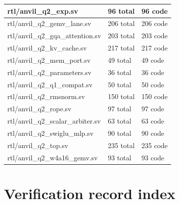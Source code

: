 \documentclass[11pt,a4paper]{article}
\begin{document}
{\begin{longtable}{@{}L{0.55\textwidth}|L{0.18\textwidth}|L{0.18\textwidth}@{}}
rtl/\allowbreak{}anvil\_\allowbreak{}q2\_\allowbreak{}exp.sv & 96 total & 96 code\\[2pt]\hline

rtl/\allowbreak{}anvil\_\allowbreak{}q2\_\allowbreak{}gemv\_\allowbreak{}lane.sv & 206 total & 206 code\\[2pt]\hline

rtl/\allowbreak{}anvil\_\allowbreak{}q2\_\allowbreak{}gqa\_\allowbreak{}attention.sv & 203 total & 203 code\\[2pt]\hline

rtl/\allowbreak{}anvil\_\allowbreak{}q2\_\allowbreak{}kv\_\allowbreak{}cache.sv & 217 total & 217 code\\[2pt]\hline

rtl/\allowbreak{}anvil\_\allowbreak{}q2\_\allowbreak{}mem\_\allowbreak{}port.sv & 49 total & 49 code\\[2pt]\hline

rtl/\allowbreak{}anvil\_\allowbreak{}q2\_\allowbreak{}parameters.sv & 36 total & 36 code\\[2pt]\hline

rtl/\allowbreak{}anvil\_\allowbreak{}q2\_\allowbreak{}q1\_\allowbreak{}compat.sv & 50 total & 50 code\\[2pt]\hline

rtl/\allowbreak{}anvil\_\allowbreak{}q2\_\allowbreak{}rmsnorm.sv & 150 total & 150 code\\[2pt]\hline

rtl/\allowbreak{}anvil\_\allowbreak{}q2\_\allowbreak{}rope.sv & 97 total & 97 code\\[2pt]\hline

rtl/\allowbreak{}anvil\_\allowbreak{}q2\_\allowbreak{}scalar\_\allowbreak{}arbiter.sv & 63 total & 63 code\\[2pt]\hline

rtl/\allowbreak{}anvil\_\allowbreak{}q2\_\allowbreak{}swiglu\_\allowbreak{}mlp.sv & 90 total & 90 code\\[2pt]\hline

rtl/\allowbreak{}anvil\_\allowbreak{}q2\_\allowbreak{}top.sv & 235 total & 235 code\\[2pt]\hline

rtl/\allowbreak{}anvil\_\allowbreak{}q2\_\allowbreak{}w4a16\_\allowbreak{}gemv.sv & 93 total & 93 code\\[2pt]\hline

\bottomrule\end{longtable}}

\section{Verification record index}
\end{document}
